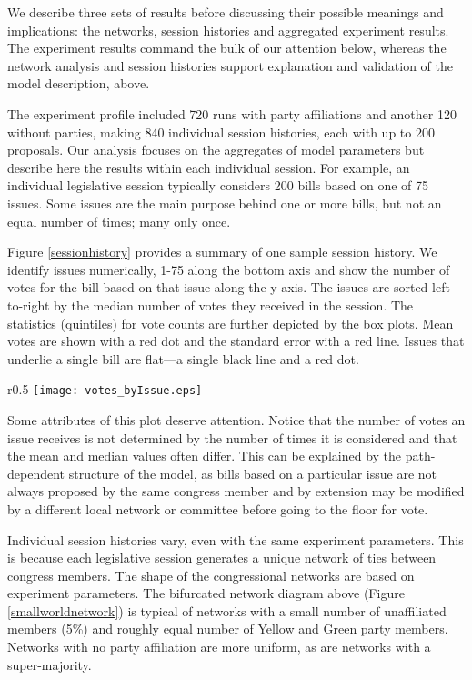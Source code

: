 \documentclass[pdftex,12pt]{llncs}
\begin{document}
 
We describe three sets of results before discussing their possible meanings and implications: the networks, session histories and aggregated experiment results. 
The experiment results command the bulk of our attention below, whereas the network analysis and session histories support explanation and validation of the model description, above. 

The experiment profile included 720 runs with party affiliations and another 120 without parties, making 840 individual session histories, each with up to 200 proposals. Our analysis focuses on the aggregates of model parameters but describe here the results within each individual session. 
For example, an individual legislative session typically considers 200 bills based on one of 75 issues. 
Some issues are the main purpose behind one or more bills, but not an equal number of times; many only once. 

Figure \ref{sessionhistory} provides a summary of one sample session history. 
We identify issues numerically, 1-75 along the bottom axis and show the number of votes for the bill based on that issue along the y axis. 
The issues are sorted left-to-right by the median number of votes they received in the session. 
The statistics (quintiles) for vote counts are further depicted by the box plots. 
Mean votes are shown with a red dot and the standard error with a red line. 
Issues that underlie a single bill are flat---a single black line and a red dot. 

\begin{wrapfigure}{r}{0.5\textwidth}
  \texttt{[image: votes\_byIssue.eps]}
 \caption[ ]{Summary of proposals, aggregated by issue identifier for an individual session history}
 \label{sessionhistory}
\end{wrapfigure}

Some attributes of this plot deserve attention. 
Notice that the number of votes an issue receives is not determined by the number of times it is considered and that the mean and median values often differ. 
This can be explained by the path-dependent structure of the model, as bills based on a particular issue are not always proposed by the same congress member and by extension may be modified by a different local network or committee before going to the floor for vote.

Individual session histories vary, even with the same experiment parameters. 
This is because each legislative session generates a unique network of ties between congress members. 
The shape of the congressional networks are based on experiment parameters. 
The bifurcated network diagram above (Figure \ref{smallworldnetwork}) is typical of networks with a small number of unaffiliated members (5\%) and roughly equal number of Yellow and Green party members. 
Networks with no party affiliation are more uniform, as are networks with a super-majority.  
\end{document}
